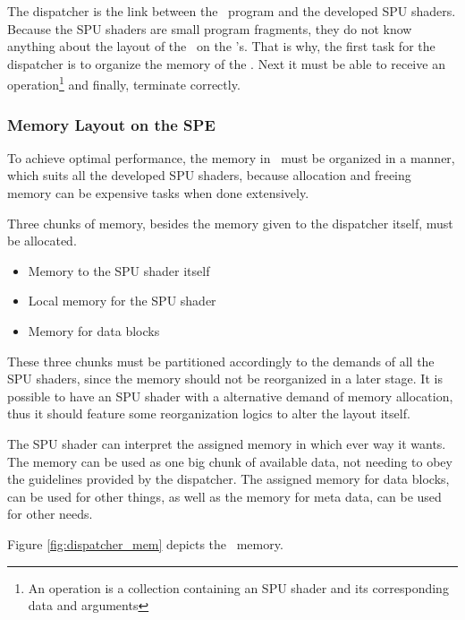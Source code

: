 The dispatcher is the link between the \PPE\ program and the developed
SPU shaders. Because the SPU shaders are small program fragments, they
do not know anything about the layout of the \LS\ on
the \SPE{}'s. That is why, the first task for the dispatcher is to
organize the memory of the \LS{}. Next it must be able to receive an
operation\footnote{An operation is a collection containing an SPU
shader and its corresponding data and arguments} and finally,
terminate correctly.

\subsubsection{Memory Layout on the SPE}

To achieve optimal performance, the memory in \LS\ must be organized
in a manner, which suits all the developed SPU shaders, because
allocation and freeing memory can be expensive tasks when done
extensively.

Three chunks of memory, besides the memory given to the dispatcher
itself, must be allocated.

\begin{itemize}
\item{Memory to the SPU shader itself}
\item{Local memory for the SPU shader}
\item{Memory for data blocks}
\end{itemize}

These three chunks must be partitioned accordingly to the demands of
all the SPU shaders, since the memory should not be reorganized in a
later stage. It is possible to have an SPU shader with a alternative
demand of memory allocation, thus it should feature some
reorganization logics to alter the layout itself. 



The SPU shader can interpret the assigned memory in which ever way it
wants. The memory can be used as one big chunk of available data, not
needing to obey the guidelines provided by the dispatcher. The
assigned memory for data blocks, can be used for other things, as well
as the memory for meta data, can be used for other needs.

Figure \ref{fig:dispatcher_mem} depicts the \LS\ memory.


